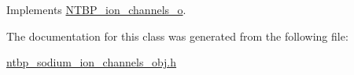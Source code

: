 Implements \hyperlink{class_n_t_b_p__ion__channels__o_a6c865e74014bef8bc9ae547e4835ec81}{NTBP\_\-ion\_\-channels\_\-o}.



The documentation for this class was generated from the following file:\begin{DoxyCompactItemize}
\item 
\hyperlink{ntbp__sodium__ion__channels__obj_8h}{ntbp\_\-sodium\_\-ion\_\-channels\_\-obj.h}\end{DoxyCompactItemize}
